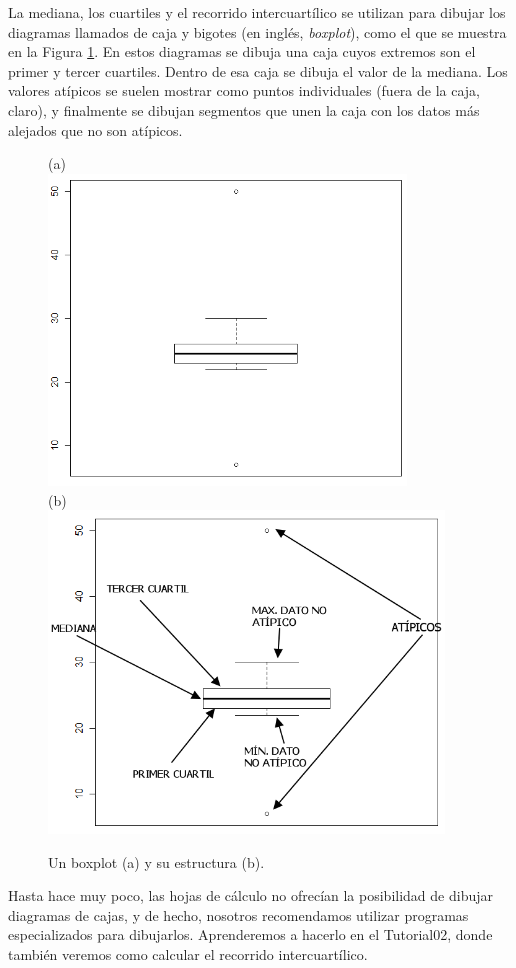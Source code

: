 La mediana, los cuartiles y el recorrido intercuartílico se utilizan para dibujar los diagramas
llamados de  {\sf caja y bigotes} (en inglés,
{\em boxplot}), como el que se muestra en la Figura \ref{cap02:fig:Boxplot}. En estos
diagramas se dibuja una caja cuyos extremos son el primer y tercer cuartiles. Dentro de esa caja se
dibuja el valor de la mediana. Los valores atípicos se suelen mostrar como puntos individuales
(fuera de la caja, claro), y finalmente se dibujan segmentos que unen la caja con los datos más
alejados que no son atípicos.
    \begin{figure}[hp]
	\begin{center}
    (a)\\
	\includegraphics[width=9.5cm]{../fig/Cap02-BoxPlot.png}\\[3mm]
    (b)\\
    \includegraphics[width=10.5cm]{../fig/Cap02-BoxPlot-Estructura.png}
    \end{center}
	\caption{Un boxplot (a) y su estructura (b).}
	\label{cap02:fig:Boxplot}
    \end{figure}
Hasta hace muy poco, las hojas de cálculo no ofrecían la posibilidad de dibujar diagramas de cajas, y de hecho, nosotros recomendamos utilizar programas especializados para dibujarlos.
Aprenderemos a hacerlo en el Tutorial02, donde también veremos como calcular el recorrido
intercuartílico.

